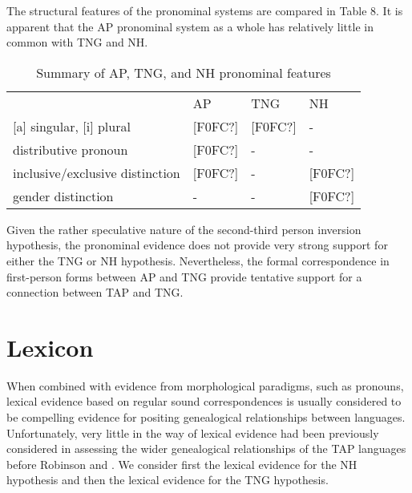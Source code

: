 The structural features of the pronominal systems are compared in Table 8. It is apparent that the AP pronominal system as a whole has relatively little in common with TNG and NH.



\begin{table}\centering


\begin{tabular}{llll}& AP & TNG & NH \\
 {}[a] singular, [i] plural& [F0FC?] & [F0FC?] & - \\
distributive pronoun& [F0FC?] & - & - \\
inclusive/exclusive distinction& [F0FC?] & - & [F0FC?] \\
gender distinction& - & - & [F0FC?] \\

\end{tabular}

\caption{Summary of AP, TNG, and NH pronominal features}\end{table}
Given the rather speculative nature of the second-third person inversion hypothesis, the pronominal evidence does not provide very strong support for either the TNG or NH hypothesis. Nevertheless, the formal correspondence in first-person forms between AP and TNG provide tentative support for a connection between TAP and TNG.

\section{Lexicon}
When combined with evidence from morphological paradigms, such as pronouns, lexical evidence based on regular sound correspondences is usually considered to be compelling evidence for positing genealogical relationships between languages. Unfortunately, very little in the way of lexical evidence had been previously considered in assessing the wider genealogical relationships of the TAP languages before Robinson and \citet{Holton2012}. We consider first the lexical evidence for the NH hypothesis and then the lexical evidence for the TNG hypothesis.

